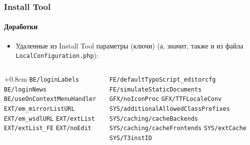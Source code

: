 
\begin{frame}[fragile]
	\frametitle{Install Tool}
	\framesubtitle{Доработки}

	\begin{itemize}
		\item Удаленные из Install Tool параметры (ключи) \newline
			(а, значит, также и из файла \texttt{LocalConfiguration.php}):
	\end{itemize}

	\begin{columns}[T]
		\begin{column}{.5\textwidth}
			\advance\leftskip+0.8cm
			\smaller
				\texttt{BE/loginLabels}\newline
				\texttt{BE/loginNews}\newline
				\texttt{BE/useOnContextMenuHandler}\newline
				\texttt{EXT/em\_mirrorListURL}\newline
				\texttt{EXT/em\_wsdlURL}\newline
				\texttt{EXT/extList}\newline
				\texttt{EXT/extList\_FE}\newline
				\texttt{EXT/noEdit}\newline
			\normalsize
		\end{column}
		\begin{column}{.5\textwidth}
			\smaller
				\texttt{FE/defaultTypoScript\_editorcfg}\newline
				\texttt{FE/simulateStaticDocuments}\newline
				\texttt{GFX/noIconProc}\newline
				\texttt{GFX/TTFLocaleConv}\newline
				\texttt{SYS/additionalAllowedClassPrefixes}\newline
				\texttt{SYS/caching/cacheBackends}\newline
				\texttt{SYS/caching/cacheFrontends}\newline
				\texttt{SYS/extCache}\newline
				\texttt{SYS/T3instID}\newline
			\normalsize
		\end{column}

	\end{columns}

\end{frame}


